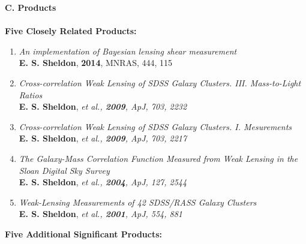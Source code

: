 \documentclass[10pt]{article}
\begin{document}
{\large \bf C. Products}\\
\vspace{-0.75em}\\
{\bf Five Closely Related Products:}
\begin{enumerate}

    \item \textit{An implementation of Bayesian lensing shear measurement}\\
        {\bf E. S. Sheldon}, {\bf 2014}, MNRAS, 444, 115

    \item \textit{Cross-correlation Weak Lensing of SDSS Galaxy Clusters. III. Mass-to-Light Ratios}\\
        {\bf E. S. Sheldon}, \em{et al.}, {\bf 2009}, ApJ, 703, 2232

    \item \textit{Cross-correlation Weak Lensing of SDSS Galaxy Clusters. I. Mesurements}\\
        {\bf E. S. Sheldon}, \em{et al.}, {\bf 2009}, ApJ, 703, 2217

    \item \textit{The Galaxy-Mass Correlation Function Measured from Weak Lensing in the Sloan Digital Sky Survey}\\
        {\bf E. S. Sheldon}, \em{et al.}, {\bf 2004}, ApJ, 127, 2544

    \item \textit{Weak-Lensing Measurements of 42 SDSS/RASS Galaxy Clusters}\\
        {\bf E. S. Sheldon}, \em{et al.}, {\bf 2001}, ApJ, 554, 881

\end{enumerate}
{\bf Five Additional Significant Products:}
\vspace{-0.5em}
\end{document}

